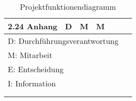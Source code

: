 \begin{longtable}{l|c|c|c|c|c|c}
  2.24 Anhang                            & D              & M           & M          &          &               &               \\
  \midrule
  \multicolumn{7}{l}{D: Durchführungsverantwortung}                                                                             \\
  \multicolumn{7}{l}{M: Mitarbeit}                                                                                              \\
  \multicolumn{7}{l}{E: Entscheidung}                                                                                           \\
  \multicolumn{7}{l}{I: Information}                                                                                            \\

  \bottomrule

  \multicolumn{7}{c}{}                                                                                                          \\

  \caption{Projektfunktionendiagramm}
  \label{tab:projektfunktionendiagramm}
\end{longtable}
